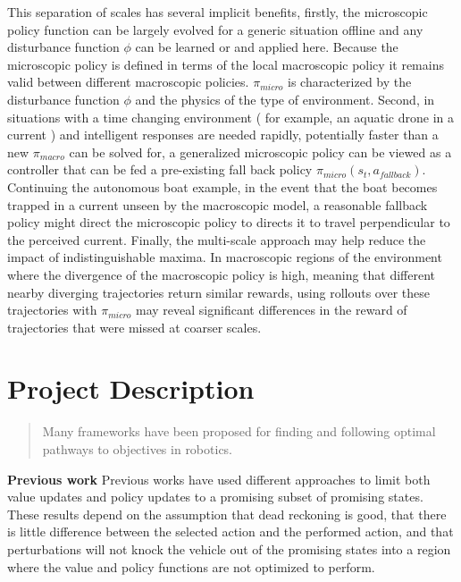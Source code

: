 \documentclass[12pt]{article}
\begin{document}
This separation of scales has several implicit benefits, firstly, the microscopic policy function can be largely evolved for a generic situation offline and any disturbance function $\phi$ can be learned or and applied here. Because the microscopic policy is defined in terms of the local macroscopic policy it remains valid between different macroscopic policies. $\pi_{micro}$ is characterized by the disturbance function $\phi$ and the physics of the type of environment. Second, in situations with a time changing environment ( for example, an aquatic drone in a current ) and intelligent responses are needed rapidly, potentially faster than a new $\pi_{macro}$ can be solved for, a generalized microscopic policy can be viewed as a controller that can be fed a pre-existing fall back policy $\pi_{micro}(s_t,a_{fallback})$. Continuing the autonomous boat example, in the event that the boat becomes trapped in a current unseen by the macroscopic model, a reasonable fallback policy might direct the microscopic policy to directs it to travel perpendicular to the perceived current. Finally, the multi-scale approach may help reduce the impact of indistinguishable maxima. In macroscopic regions of the environment where the divergence of the macroscopic policy is high, meaning that different nearby diverging trajectories return similar rewards, using rollouts over these trajectories with $\pi_{micro}$ may reveal significant differences in the reward of trajectories that were missed at coarser scales.

\newpage
\section{Project Description}

\begin{abstract}
Many frameworks have been proposed for finding and following optimal pathways to objectives in robotics. 
\end{abstract}
\textbf{Previous work}
Previous works have used different approaches to limit both value updates and policy updates to a promising subset of promising states. These results depend on the assumption that dead reckoning is good, that there is little difference between the selected action and the performed action, and that perturbations will not knock the vehicle out of the promising states into a region where the value and policy functions are not optimized to perform.
\end{document}
